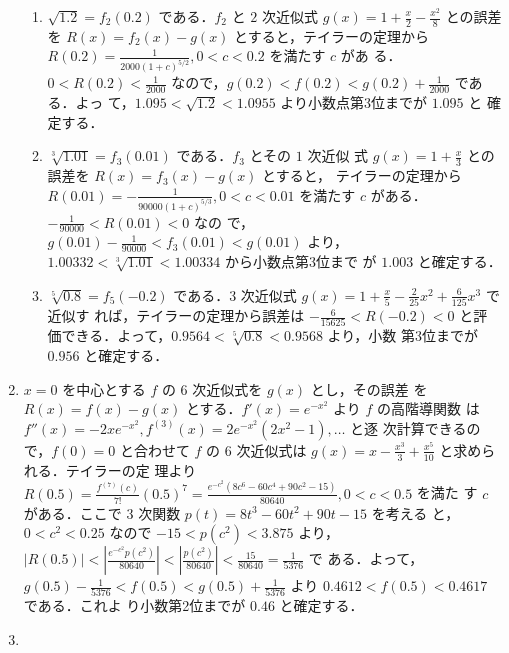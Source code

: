 \documentclass[11pt, uplatex, dvipdfmx, twoside]{jsarticle}
\begin{document}
\begin{enumerate}[label=\ref{sec:taylor}.\arabic*]
\begin{enumerate}[label=(\arabic*)]
    \setlength{\itemsep}{1ex}
    
  \item $\sqrt{1.2}=f_2(0.2)$ である．$f_2$ と $2$ 次近似式
    $g(x) = 1+\frac{x}{2}-\frac{x^2}{8}$ との誤差を $R(x) =
    f_2(x)-g(x)$ とすると，テイラーの定理から
    $R(0.2) = \frac{1}{2000(1+c)^{5/2}}, 0 < c < 0.2$ を満たす $c$ があ
    る．$0 < R(0.2) < \frac{1}{2000}$
    なので，$g(0.2) < f(0.2) < g(0.2)+ \frac{1}{2000}$ である．よっ
    て，$1.095 < \sqrt{1.2} < 1.0955$ より小数点第3位までが $1.095$ と
    確定する．
    
  \item $\sqrt[3]{1.01}=f_3(0.01)$ である．$f_3$ とその $1$ 次近似
    式 $g(x) = 1+\frac{x}{3}$ との誤差を $R(x) = f_3(x)-g(x)$ とすると，
    テイラーの定理から $R(0.01) = -\frac{1}{90000(1+c)^{5/3}}, 0 < c <
    0.01$ を満たす $c$ がある．$-\frac{1}{90000} < R(0.01) < 0$ なの
    で，$g(0.01) -\frac{1}{90000} < f_3(0.01) < g(0.01)$
    より，$1.00332 < \sqrt[3]{1.01} < 1.00334$ から小数点第3位まで
    が $1.003$ と確定する．
    
  \item $\sqrt[5]{0.8} = f_5(-0.2)$ である．$3$ 次近似式
    $g(x) = 1+\frac{x}{5} - \frac{2}{25}x^2+\frac{6}{125}x^3$ で近似す
    れば，テイラーの定理から誤差は $-\frac{6}{15625} < R(-0.2) <0$ と評
    価できる．よって，$ 0.9564 < \sqrt[5]{0.8} < 0.9568$ より，小数
    第3位までが $0.956$ と確定する．
    
  \end{enumerate}

\item $x=0$ を中心とする $f$ の $6$ 次近似式を $g(x)$ とし，その誤差
  を $R(x)=f(x)-g(x)$ とする．$f'(x)=e^{-x^2}$ より $f$ の高階導関数
  は $f''(x) = -2xe^{-x^2}, f^{(3)}(x)=2e^{-x^2}(2x^2-1), \ldots$ と逐
  次計算できるので，$f(0)=0$ と合わせて $f$ の $6$ 次近似式は
  $g(x)= x - \frac{x^3}{3} + \frac{x^5}{10}$ と求められる．テイラーの定
  理より
  $R(0.5) = \frac{f^{(7)}(c)}{7!}(0.5)^7=
  \frac{e^{-c^2}(8c^6-60c^4+90c^2-15)}{80640}, 0 < c < 0.5$ を満た
  す $c$ がある．ここで $3$ 次関数 $p(t) = 8t^3-60t^2+90t-15$ を考える
  と，$0<c^2<0.25$ なので $-15 < p(c^2) < 3.875$
  より，$|R(0.5)| < \left|\frac{e^{-c^2}p(c^2)}{80640}\right| < \left|
    \frac{p(c^2)}{80640}\right| < \frac{15}{80640} = \frac{1}{5376}$ で
  ある．よって，$g(0.5) - \frac{1}{5376} < f(0.5) <
  g(0.5)+\frac{1}{5376}$ より $0.4612 < f(0.5) < 0.4617$ である．これよ
  り小数第2位までが $0.46$ と確定する．

\item
  \begin{enumerate}[label=(\arabic*)]
    

\end{enumerate}
\end{enumerate}
\end{document}
